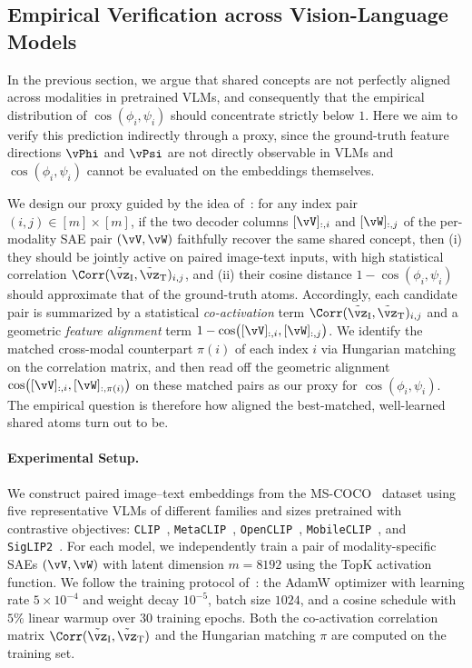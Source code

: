\subsection{Empirical Verification across Vision-Language Models}
\label{sec:heterogeneity:empirical}

In the previous section, we argue that shared concepts are not perfectly aligned across modalities in pretrained VLMs, and consequently that the empirical distribution of $\cos(\phi_i, \psi_i)$ should concentrate strictly below $1$.
Here we aim to verify this prediction indirectly through a proxy, since the ground-truth feature directions $\vPhi$ and $\vPsi$ are not directly observable in VLMs and $\cos(\phi_i, \psi_i)$ cannot be evaluated on the embeddings themselves.

We design our proxy guided by the idea of~\citet{papadimitriou2025interpreting}: for any index pair $(i, j) \in [m] \times [m]$, if the two decoder columns $[\vV]_{:,i}$ and $[\vW]_{:,j}$ of the per-modality SAE pair $(\vV, \vW)$ faithfully recover the same shared concept, then (i) they should be jointly active on paired image-text inputs, with high statistical correlation $\Corr(\tilde{\vz}_{\mathrm I}, \tilde{\vz}_{\mathrm T})_{i,j}$, and (ii) their cosine distance $1 - \cos(\phi_i, \psi_i)$ should approximate that of the ground-truth atoms.
Accordingly, each candidate pair is summarized by a statistical \emph{co-activation} term $\Corr(\tilde{\vz}_{\mathrm I}, \tilde{\vz}_{\mathrm T})_{i,j}$ and a geometric \emph{feature alignment} term $1 - \cos\!\big([\vV]_{:,i}, [\vW]_{:,j}\big)$.
We identify the matched cross-modal counterpart $\pi(i)$ of each index $i$ via Hungarian matching on the correlation matrix, and then read off the geometric alignment $\cos\!\big([\vV]_{:,i}, [\vW]_{:,\pi(i)}\big)$ on these matched pairs as our proxy for $\cos(\phi_i, \psi_i)$.
The empirical question is therefore how aligned the best-matched, well-learned shared atoms turn out to be.

\paragraph{Experimental Setup.}
We construct paired image--text embeddings from the MS-COCO~\citep{lin2014microsoft} dataset using five representative VLMs of different families and sizes pretrained with contrastive objectives: \texttt{CLIP}~\citep{radford21clip}, \texttt{MetaCLIP}~\citep{}, \texttt{OpenCLIP}~\citep{}, \texttt{MobileCLIP}~\citep{}, and \texttt{SigLIP2}~\citep{}.
For each model, we independently train a pair of modality-specific SAEs $(\vV, \vW)$ with latent dimension $m = 8192$ using the TopK activation function.
We follow the training protocol of~\citet{papadimitriou2025interpreting}: the AdamW optimizer with learning rate $5{\times}10^{-4}$ and weight decay $10^{-5}$, batch size $1024$, and a cosine schedule with $5\%$ linear warmup over $30$ training epochs.
Both the co-activation correlation matrix $\Corr(\tilde{\vz}_{\mathrm I}, \tilde{\vz}_{\mathrm T})$ and the Hungarian matching $\pi$ are computed on the training set.

